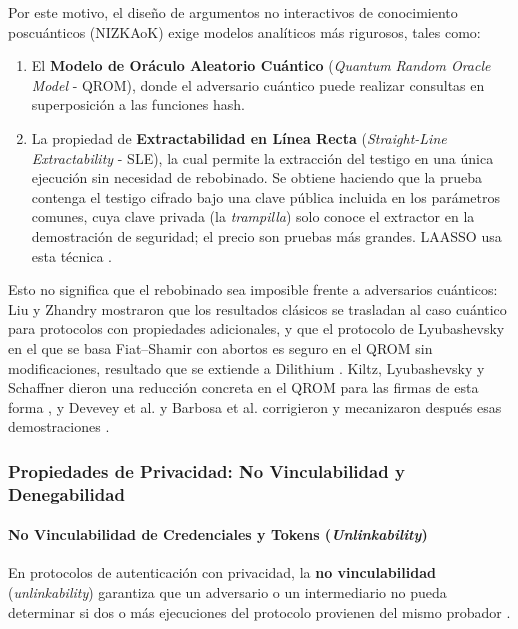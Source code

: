 Por este motivo, el diseño de argumentos no interactivos de conocimiento poscuánticos (NIZKAoK) exige modelos analíticos más rigurosos, tales como:
\begin{enumerate}
    \item El \textbf{Modelo de Oráculo Aleatorio Cuántico} (\textit{Quantum Random Oracle Model} - QROM), donde el adversario cuántico puede realizar consultas en superposición a las funciones hash.
    \item La propiedad de \textbf{Extractabilidad en Línea Recta} (\textit{Straight-Line Extractability} - SLE), la cual permite la extracción del testigo en una única ejecución sin necesidad de rebobinado. Se obtiene haciendo que la prueba contenga el testigo cifrado bajo una clave pública incluida en los parámetros comunes, cuya clave privada (la \textit{trampilla}) solo conoce el extractor en la demostración de seguridad; el precio son pruebas más grandes. LAASSO usa esta técnica \cite{ma2026laasso}.
\end{enumerate}
Esto no significa que el rebobinado sea imposible frente a adversarios cuánticos: Liu y Zhandry mostraron que los resultados clásicos se trasladan al caso cuántico para protocolos con propiedades adicionales, y que el protocolo de Lyubashevsky en el que se basa Fiat--Shamir con abortos es seguro en el QROM sin modificaciones, resultado que se extiende a Dilithium \cite{liu2019revisiting}. Kiltz, Lyubashevsky y Schaffner dieron una reducción concreta en el QROM para las firmas de esta forma \cite{kiltz2018concrete}, y Devevey et al. y Barbosa et al. corrigieron y mecanizaron después esas demostraciones \cite{devevey2023detailed, barbosa2023fixing}.

\subsubsection{Propiedades de Privacidad: No Vinculabilidad y Denegabilidad}

\paragraph{No Vinculabilidad de Credenciales y Tokens (\textit{Unlinkability})}
\label{sec:no-vinculabilidad}
En protocolos de autenticación con privacidad, la \textbf{no vinculabilidad} (\textit{unlinkability}) garantiza que un adversario o un intermediario no pueda determinar si dos o más ejecuciones del protocolo provienen del mismo probador \cite{ma2026laasso}.

